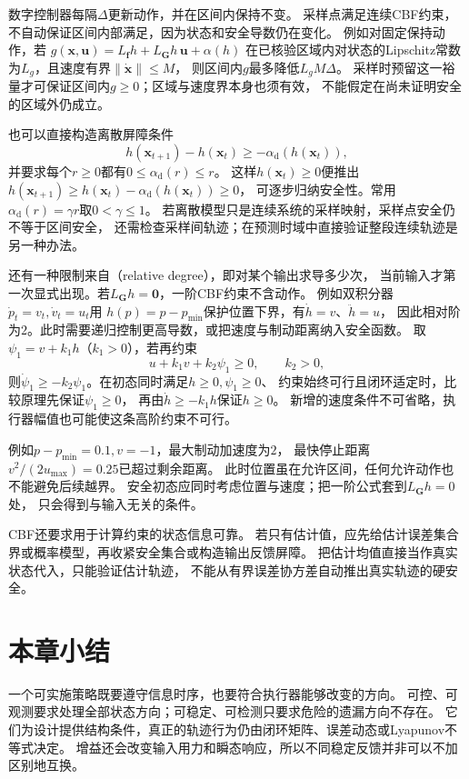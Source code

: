 数字控制器每隔$\Delta$更新动作，并在区间内保持不变。
采样点满足连续CBF约束，不自动保证区间内部满足，因为状态和安全导数仍在变化。
例如对固定保持动作，若
$g(\bm x,\bm u)=L_{\bm f}h+L_{\bm G}h\,\bm u+\alpha(h)$
在已核验区域内对状态的Lipschitz常数为$L_g$，且速度有界$\|\dot{\bm x}\|\leq M$，
则区间内$g$最多降低$L_gM\Delta$。
采样时预留这一裕量才可保证区间内$g\geq0$；区域与速度界本身也须有效，
不能假定在尚未证明安全的区域外仍成立。

也可以直接构造离散屏障条件
\[
  h(\bm x_{t+1})-h(\bm x_t)\geq-\alpha_{\mathrm d}(h(\bm x_t)),
\]
并要求每个$r\geq0$都有$0\leq\alpha_{\mathrm d}(r)\leq r$。
这样$h(\bm x_t)\geq0$便推出
$h(\bm x_{t+1})\geq h(\bm x_t)-\alpha_{\mathrm d}(h(\bm x_t))\geq0$，
可逐步归纳安全性。常用$\alpha_{\mathrm d}(r)=\gamma r$取$0<\gamma\leq1$。
若离散模型只是连续系统的采样映射，采样点安全仍不等于区间安全，
还需检查采样间轨迹；在预测时域中直接验证整段连续轨迹是另一种办法。

还有一种限制来自（relative degree），即对某个输出求导多少次，
当前输入才第一次显式出现。若$L_{\bm G}h=\bm0$，一阶CBF约束不含动作。
例如双积分器$\dot p_t=v_t,\dot v_t=u_t$用
$h(p)=p-p_{\min}$保护位置下界，有$\dot h=v$、$\ddot h=u$，
因此相对阶为$2$。此时需要递归控制更高导数，或把速度与制动距离纳入安全函数。
取$\psi_1=v+k_1h$（$k_1>0$），若再约束
\[
  u+k_1v+k_2\psi_1\geq0,\qquad k_2>0,
\]
则$\dot\psi_1\geq-k_2\psi_1$。在初态同时满足$h\geq0,\psi_1\geq0$、
约束始终可行且闭环适定时，比较原理先保证$\psi_1\geq0$，
再由$\dot h\geq-k_1h$保证$h\geq0$。
新增的速度条件不可省略，执行器幅值也可能使这条高阶约束不可行。

例如$p-p_{\min}=0.1,v=-1$，最大制动加速度为$2$，
最快停止距离$v^2/(2u_{\max})=0.25$已超过剩余距离。
此时位置虽在允许区间，任何允许动作也不能避免后续越界。
安全初态应同时考虑位置与速度；把一阶公式套到$L_{\bm G}h=0$处，
只会得到与输入无关的条件。

CBF还要求用于计算约束的状态信息可靠。
若只有估计值，应先给估计误差集合界或概率模型，再收紧安全集合或构造输出反馈屏障。
把估计均值直接当作真实状态代入，只能验证估计轨迹，
不能从有界误差协方差自动推出真实轨迹的硬安全。

\section{本章小结}
\label{sec:control-theory-summary}

一个可实施策略既要遵守信息时序，也要符合执行器能够改变的方向。
可控、可观测要求处理全部状态方向；可稳定、可检测只要求危险的遗漏方向不存在。
它们为设计提供结构条件，真正的轨迹行为仍由闭环矩阵、误差动态或Lyapunov不等式决定。
增益还会改变输入用力和瞬态响应，所以不同稳定反馈并非可以不加区别地互换。

